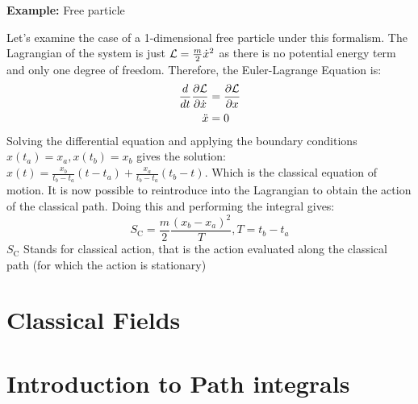 \vspace{1mm}\noindent \textbf{Example:} Free particle 


\vspace{1mm}\noindent Let's examine the case of a 1-dimensional free particle under this formalism. The Lagrangian of the system is just $\mathcal{L} = \frac{m}{2}\dot x^2$ as there is no potential energy term and only one degree of freedom. Therefore, the Euler-Lagrange Equation is:
\begin{align}
         \frac{d}{dt} \frac{\partial  \mathcal{L}}{\partial \dot x} &=   \frac{\partial  \mathcal{L}}{\partial x} \\
         \ddot x &=0
\end{align}
Solving the differential equation and applying the boundary conditions $x(t_a) =x_a, x(t_b) = x_b$ gives the solution: $x(t) = \frac{x_b}{t_b-t_a}(t-t_a)+\frac{x_a}{t_b-t_a}(t_b-t) $. Which is the classical equation of motion. It is now possible to reintroduce into the Lagrangian to obtain the action of the classical path. Doing this and performing the integral gives:
\begin{equation}
    S_{\text{C}} = \frac{m}{2}\frac{(x_b-x_a)^2}{T}, T = t_b-t_a
\end{equation}
$  S_{\text{C}}$ Stands for classical action, that is the action evaluated along the classical path (for which the action is stationary)

\section{Classical Fields}
\section{Introduction to Path integrals}